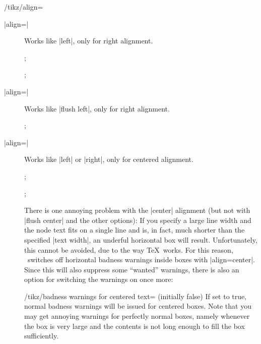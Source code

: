 \begin{key}{/tikz/align=}
\begin{description}
  \item[|align=|]
    Works like |left|, only for right alignment.
\begin{codeexample}[]
\tikz {};
\end{codeexample}
\begin{codeexample}[]
\tikz {};
\end{codeexample}

  \item[|align=|]
    Works like |flush left|, only for right alignment.
\begin{codeexample}[]
\tikz {};
\end{codeexample}

  \item[|align=|]
    Works like |left| or |right|, only for centered alignment.
\begin{codeexample}[]
\tikz {};
\end{codeexample}
\begin{codeexample}[]
\tikz {};
\end{codeexample}

    There is one annoying problem with the |center|
    alignment (but not with |flush center| and the other options): If
    you specify a large line width and the node text  
    fits on a single line and is, in fact, much shorter than the
    specified |text width|, an underful horizontal box will
    result. Unfortunately, this cannot be avoided, due to the way \TeX\ works.
    For this reason, \tikzname\ switches off horizontal badness
    warnings inside boxes with |align=center|. Since this will also
    suppress some ``wanted'' warnings, there is also an option for
    switching the warnings on once more:

    \begin{key}{/tikz/badness warnings for centered text= (initially false)}
      If set to true, normal badness warnings will be issued for
      centered boxes. Note that you may get annoying warnings for
      perfectly normal boxes, namely whenever the box is very large
      and the contents is not long enough to fill the box
      sufficiently. 
    \end{key}


\end{description}
\end{key}
